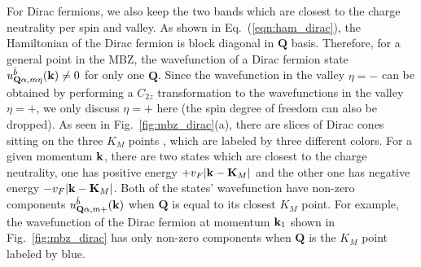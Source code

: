 \documentclass[prb,aps,nofootinbib,amssymb,twocolumn,superscriptaddress,10pt]{revtex4-2}
\begin{document}
\begin{widetext}
For Dirac fermions, we also keep the two bands which are closest to the charge neutrality per spin and valley. As shown in Eq.~(\ref{eqn:ham_dirac}), the Hamiltonian of the Dirac fermion is block diagonal in $\mathbf{Q}$ basis. Therefore, for a general point in the MBZ, the wavefunction of a Dirac fermion state $u^{\hat{b}}_{\mathbf{Q}\alpha,m\eta}(\mathbf{k}) \neq 0$ for only one $\mathbf{Q}$. Since the wavefunction in the valley $\eta = -$ can be obtained by performing a $C_{2z}$ transformation to the wavefunctions in the valley $\eta = +$, we only discuss $\eta = +$ here (the spin degree of freedom can also be dropped). As seen in Fig.~\ref{fig:mbz_dirac}(a), there are slices of Dirac cones sitting on the three $K_M$ points \cite{TSTGI}, which are labeled by three different colors. For a given momentum $\mathbf{k}$, there are two states which are closest to the charge neutrality, one has positive energy $+v_F|\mathbf{k} - \mathbf{K}_M|$ and the other one has negative energy $-v_F|\mathbf{k} - \mathbf{K}_M|$. Both of the states' wavefunction have non-zero components $u^{\hat{b}}_{\mathbf{Q}\alpha,m +}(\mathbf{k})$ when $\mathbf{Q}$ is equal to its closest $K_M$ point. For example, the wavefunction of the Dirac fermion at momentum $\mathbf{k}_1$ shown in Fig.~\ref{fig:mbz_dirac} has only non-zero components when $\mathbf{Q}$ is the $K_M$ point labeled by blue.


\end{widetext}
\end{document}
